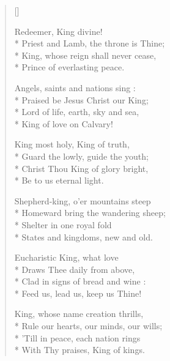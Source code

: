 \newHymn




\begin{verse}[\versewidth]

 Redeemer, King divine!\\*
Priest and Lamb, the throne is Thine;\\*
King, whose reign shall never cease,\\*
Prince of everlasting peace.

\begin{indentedVerse}
\vin Angels, saints and nations sing :\\*
\vin Praised be Jesus Christ our King;\\*
\vin Lord of life, earth, sky and sea,\\*
\vin King of love on Calvary!
\end{indentedVerse}

King most holy, King of truth,\\*
Guard the lowly, guide the youth;\\*
Christ Thou King of glory bright,\\*
Be to us eternal light.

Shepherd-king, o'er mountains steep\\*
Homeward bring the wandering sheep;\\*
Shelter in one royal fold\\*
States and kingdoms, new and old.

Eucharistic King, what love\\*
Draws Thee daily from above,\\*
Clad in signs of bread and wine :\\*
Feed us, lead us, keep us Thine!

King, whose name creation thrills,\\*
Rule our hearts, our minds, our wills;\\*
'Till in peace, each nation rings\\*
With Thy praises, King of kings.

\end{verse}

\Hmeter{}

